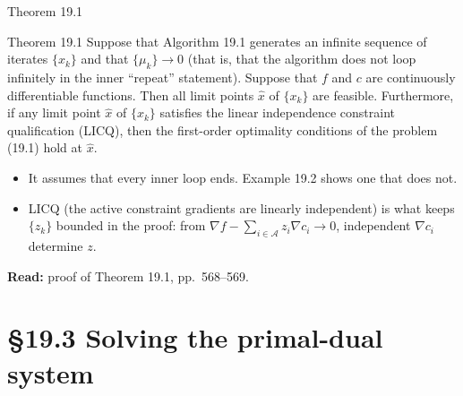 \documentclass[aspectratio=169,12pt]{beamer}
\newcommand{\readbook}[1]{{\color{red}\textbf{Read:} #1}}
\newcommand{\cA}{\mathcal{A}}
\begin{document}
\begin{frame}{Theorem 19.1}
  \begin{block}{Theorem 19.1}
    Suppose that Algorithm 19.1 generates an infinite sequence of iterates $\{x_{k}\}$ and that
    $\{\mu_{k}\}\to 0$ (that is, that the algorithm does not loop infinitely in the inner ``repeat'' statement).
    Suppose that $f$ and $c$ are continuously differentiable functions. Then all limit points $\hat x$ of
    $\{x_{k}\}$ are feasible. Furthermore, if any limit point $\hat x$ of $\{x_{k}\}$ satisfies the linear
    independence constraint qualification (LICQ), then the first-order optimality conditions of the
    problem (19.1) hold at $\hat x$.
  \end{block}
  \begin{itemize}\setlength\itemsep{0.3em}
    \item It assumes that every inner loop ends. Example 19.2 shows one that does not.
    \item LICQ (the active constraint gradients are linearly independent) is what keeps $\{z_{k}\}$ bounded
      in the proof: from $\nabla f-\sum_{i\in\cA}z_{i}\nabla c_{i}\to 0$, independent $\nabla c_{i}$ determine $z$.
  \end{itemize}
  \readbook{proof of Theorem 19.1, pp.~568--569.}
\end{frame}

\section{\S19.3 Solving the primal-dual system}
\end{document}

